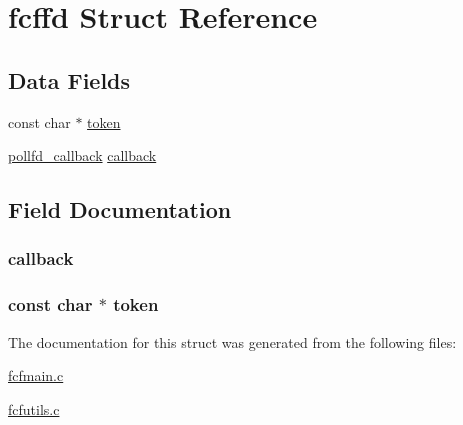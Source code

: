 \hypertarget{structfcffd}{\section{fcffd \-Struct \-Reference}
\label{structfcffd}
}
\subsection*{\-Data \-Fields}
\begin{DoxyCompactItemize}
\item 
const char $\ast$ \hyperlink{structfcffd_a7d3edfa508be401819bb24057b3c1be6}{token}
\item 
\hyperlink{fcfmain_8h_a085e004910088ee71278a46a35412ace}{pollfd\-\_\-callback} \hyperlink{structfcffd_ac3097c1d35ac0daac041f87ac44d1285}{callback}
\end{DoxyCompactItemize}


\subsection{\-Field \-Documentation}
\hypertarget{structfcffd_ac3097c1d35ac0daac041f87ac44d1285}{
\subsubsection[{callback}]{ {\bf callback}}}\label{structfcffd_ac3097c1d35ac0daac041f87ac44d1285}
\hypertarget{structfcffd_a7d3edfa508be401819bb24057b3c1be6}{
\subsubsection[{token}]{\setlength{\rightskip}{0pt plus 5cm}const char $\ast$ {\bf token}}}\label{structfcffd_a7d3edfa508be401819bb24057b3c1be6}


\-The documentation for this struct was generated from the following files\-:\begin{DoxyCompactItemize}
\item 
\hyperlink{fcfmain_8c}{fcfmain.\-c}\item 
\hyperlink{fcfutils_8c}{fcfutils.\-c}\end{DoxyCompactItemize}
